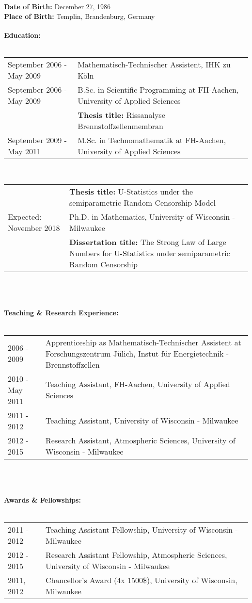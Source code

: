 \documentclass[phd]{UWMThesis}
\renewcommand{\.}{\textrm{ .}}
\theoremstyle{definition}
\numberwithin{thm}{chapter}
\begin{document}
\begin{ThesisCV}
		\noindent\textbf{Date of Birth:} December 27, 1986\\
		\textbf{Place of Birth:} Templin, Brandenburg, Germany\\
		\\
		\textbf{Education:}\\
		\\
		\begin{tabularx}{0.9\textwidth}{l X}
			September 2006 - May 2009 & Mathematisch-Technischer Assistent, IHK zu K\"oln\\
			September 2006 - May 2009 & B.Sc. in Scientific Programming at FH-Aachen, University of Applied Sciences\\
			& \textbf{Thesis title:} Rissanalyse Brennstoffzellenmembran\\
			September 2009 - May 2011 & M.Sc. in Technomathematik at FH-Aachen, University of Applied Sciences\\
		\end{tabularx}
		\\
		\begin{tabularx}{0.9\textwidth}{l X}
			\hphantom{September 2006 - May 2009} & \textbf{Thesis title:} U-Statistics under the semiparametric Random Censorship Model\\
			Expected: November 2018 & Ph.D. in Mathematics, University of Wisconsin - Milwaukee\\
			&\textbf{Dissertation title:} The Strong Law of Large Numbers for U-Statistics under semiparametric Random Censorship
		\end{tabularx}
		\\\\\\
		\noindent\textbf{Teaching \& Research Experience:}\\
		\\
		\begin{tabularx}{0.9\textwidth}{l X}
			2006 - 2009 & Apprenticeship as Mathematisch-Technischer Assistent at Forschungszentrum J\"ulich, Instut f\"ur Energietechnik - Brennstoffzellen\\
			2010 - May 2011 & Teaching Assistant, FH-Aachen, University of Applied Sciences\\
			2011 - 2012 & Teaching Assistant, University of Wisconsin - Milwaukee\\
			2012 - 2015 & Research Assistant, Atmospheric Sciences, University of Wisconsin - Milwaukee
		\end{tabularx}
		\\\\\\
		\clearpage
		\noindent\textbf{Awards \& Fellowships:}\\
		\\
		\begin{tabularx}{0.9\textwidth}{l X}
			2011 - 2012 & Teaching Assistant Fellowship, University of Wisconsin - Milwaukee\\
			2012 - 2015 & Research Assistant Fellowship, Atmospheric Sciences, University of Wisconsin - Milwaukee\\
			2011, 2012 & Chancellor's Award (4x 1500\$), University of Wisconsin, Milwaukee
		\end{tabularx}
		
	\end{ThesisCV}
	
\end{document}
